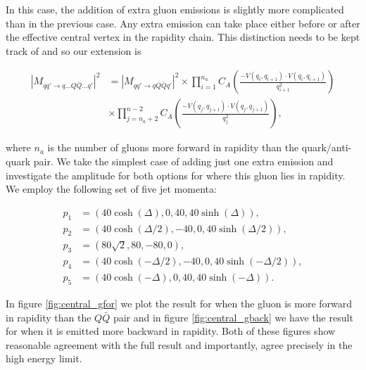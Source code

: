 In this case, the addition of extra gluon emissions is slightly more complicated than in the previous case. Any extra emission can take place either before or after the effective central vertex in the rapidity chain. This distinction needs to be kept track of and so our extension is 

\begin{equation}
\begin{split}
|M_{qq' \to q...Q\bar{Q}...q'}|^2 &= |M_{qq' \to qQ\bar{Q}q'}|^2 \times \prod_{i=1}^{n_a} C_A \left(\frac{-V(q_i,q_{i+1}) \cdot V(q_i,q_{i+1})}{q_{i+1}^2} \right) \\
&\times \prod_{j=n_a+2}^{n-2} C_A \left(\frac{-V(q_j,q_{j+1}) \cdot V(q_j,q_{j+1})}{q_j^2} \right),
\end{split}
\end{equation}

where $n_a$ is the number of gluons more forward in rapidity than the quark/anti-quark pair. We take the simplest case of adding just one extra emission and investigate the amplitude for both options for where this gluon lies in rapidity. We employ the following set of five jet momenta:

\begin{equation}
\begin{split}
p_1 & = (40 \cosh(\Delta), 0, 40, 40 \sinh(\Delta)), \\
p_2 & = (40 \cosh(\Delta/2), -40, 0, 40 \sinh(\Delta/2)), \\
p_3 & = (80 \sqrt{2}, 80, -80, 0), \\
p_4 & = (40 \cosh(-\Delta/2), -40, 0, 40 \sinh(-\Delta/2)), \\
p_5 & = (40 \cosh(-\Delta), 0, 40, 40 \sinh(-\Delta)). 
\end{split}
\end{equation}

In figure \ref{fig:central_gfor} we plot the result for when the gluon is more forward in rapidity than the $Q\bar{Q}$ pair and in figure \ref{fig:central_gback} we have the result for when it is emitted more backward in rapidity. Both of these figures show reasonable agreement with the full result and importantly, agree precisely in the high energy limit. 

